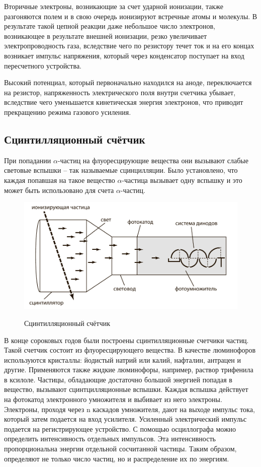 \documentclass[14pt,pscyr,titlepage]{hedreport}
\begin{document}
		Вторичные электроны, возникающие за счет  ударной ионизации, также 
		разгоняются полем и в свою очередь ионизируют встречные атомы и 
		молекулы. В результате такой цепной реакции даже небольшое число 
		электронов, возникающее в результате внешней ионизации, резко 
		увеличивает электропроводность  газа, вследствие чего по резистору 
		течет ток и на его концах возникает импульс напряжения, который через 
		конденсатор поступает на вход пересчетного устройства.

		Высокий потенциал, который первоначально находился на аноде, 
		переключается на резистор, напряженность электрического поля внутри 
		счетчика убывает, вследствие чего уменьшается кинетическая энергия 
		электронов, что приводит прекращению режима газового усиления.

	\subsection{Сцинтилляционный счётчик}
		При попадании \( \alpha \)-частиц на флуоресцирующие вещества они 
		вызывают слабые световые вспышки -- так называемые сцинцилляции. Было 
		установлено, что каждая попавшая на такое вещество 
		\( \alpha \)-частица вызывает одну вспышку и это может быть 
		использовано для счета \( \alpha \)-частиц.

		\begin{figure}[h!]
			\center
			\includegraphics[width=.8\textwidth]{scintillascope} \\
			\caption{Сцинтилляционный счётчик}
			\label{img:graph}
		\end{figure}

		В конце сороковых годов были построены сцинтилляционные счетчики частиц. 
		Такой счетчик состоит из флуоресцирующего вещества. В качестве 
		люминофоров используются кристаллы: йодистый натрий или калий, 
		нафталин, антрацен и другие. Применяются также жидкие люминофоры, 
		например, раствор трифенила в ксилоле. Частицы, обладающие достаточно 
		большой энергией попадая в вещество, вызывают сцинтцилляционные 
		вспышки. Каждая вспышка действует на фотокатод электронного умножителя 
		и выбивает из него электроны. Электроны, проходя через n каскадов 
		умножителя, дают на выходе импульс тока, который затем подается на 
		вход усилителя. Усиленный электрический импульс подается на 
		регистрирующее устройство. С помощью осциллографа можно определить 
		интенсивность отдельных импульсов. Эта интенсивность пропорциональна 
		энергии отдельной сосчитанной частицы. Таким образом, определяют не 
		только число частиц, но и распределение их по энергиям. 
\end{document}
